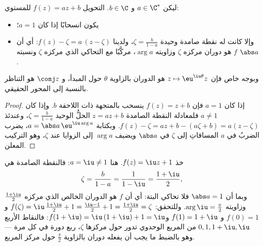 \begin{proposition}\label{prop:b1:complex:similitude}
ليكن $a \in \C^*$ و $b \in \C$. التحويل $f(z) = az + b$ للمستوي:
\begin{itemize}
  \item يكون انسحابًا إذا كان $a = 1$؛
  \item وإلا كانت له نقطة صامدة وحيدة $\zeta = \frac{b}{1-a}$،
        ولدينا $f(z) - \zeta = a\,(z - \zeta)$: أي أن $f$ هو دوران
        مركزه $\zeta$ وزاويته $\arg a$، مركَّبًا مع التحاكي
        الذي مركزه $\zeta$ ونسبته $\abs a$.
\end{itemize}
وبوجه خاص فإن $z \mapsto \eu^{\iu\theta} z$ هو الدوران بالزاوية
$\theta$ حول المبدأ، و $\conj z$ هو التناظر بالنسبة إلى المحور
الحقيقي.
\end{proposition}

\begin{proof}
إذا كان $a = 1$ فإن $f(z) = z + b$ ينسحب بالمتجهة ذات اللاحقة $b$.
وإذا كان $a \neq 1$ فلمعادلة النقطة الصامدة $z = az + b$ الحلُّ
الوحيد $\zeta = \frac{b}{1-a}$، وعندئذ $f(z) - \zeta = az + b -
(a\zeta + b) = a(z - \zeta)$. وبكتابة $a = \abs a\, \eu^{\iu\arg a}$،
يضرب الضربُ في $a$ المسافاتِ إلى $\zeta$ في $\abs a$ ويضيف
$\arg a$ إلى الزوايا عند $\zeta$، وهو التركيب المعلن.
\end{proof}

\begin{example}\label{ex:b1:complex:classify}
خذ $f(z) = \iu z + 1$. هنا $a = \iu \neq 1$: فالنقطة الصامدة هي
\[
\zeta = \frac{b}{1 - a} = \frac1{1 - \iu}
= \frac{1 + \iu}{2},
\]
وبما أن $\abs a = 1$ فلا تحاكي البتة: أي أن $f$ هو الدوران
الخالص الذي مركزه $\frac{1+\iu}2$ وزاويته $\arg \iu = \frac\pi2$.
وللتحقق: $f(\zeta) = \iu\,\frac{1+\iu}2 + 1 = \frac{\iu - 1}2 + 1 =
\frac{1 + \iu}2 = \zeta$ و $f(0) = 1$ و $f(1) = 1 + \iu$ و$f(1 +
\iu) = \iu\,(1 + \iu) + 1 = \iu$: فالنقاط الأربع $0, 1, 1+\iu, \iu$
من المربع الوحدوي تدور حول مركزها $\zeta$، ربع دورة في كل
مرة --- وهو بالضبط ما يجب أن يفعله دوران بالزاوية $\frac\pi2$ حول
مركز المربع.
\end{example}

